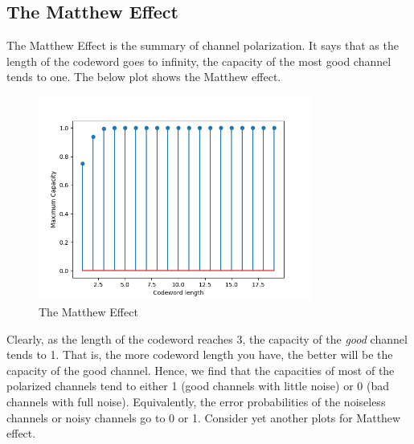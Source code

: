 \documentclass{article}
\begin{document}
\subsection{The Matthew Effect}
The Matthew Effect is the summary of channel polarization. It says that as the length of the codeword goes to infinity, the capacity of the most good channel tends to one. The below plot shows the Matthew effect.
\begin{figure}[H]
\centering
\includegraphics[width=0.8\textwidth, height=0.4\textheight]{matthew.png}
\caption{The Matthew Effect}
\end{figure}
Clearly, as the length of the codeword reaches 3, the capacity of the \textit{good} channel tends to 1. That is, the more codeword length you have, the better will be the capacity of the good channel. Hence, we find that the capacities of most of the polarized channels tend to either 1 (good channels with little noise) or 0 (bad channels with full noise). Equivalently, the error probabilities of the noiseless channels or noisy channels go to 0 or 1. Consider yet another plots for Matthew effect.
\end{document}
